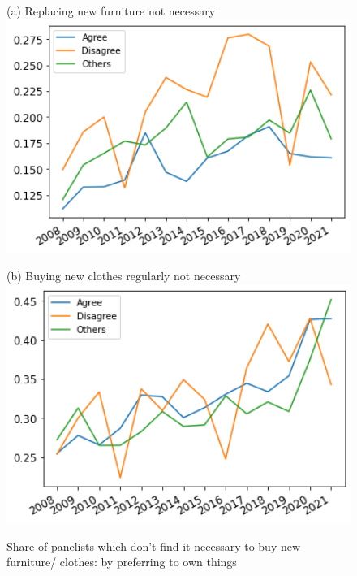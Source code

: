 \documentclass[12pt]{article}
\begin{document}
\begin{figure}[h!!]
	\centering	
	\caption{Share of panelists which don't find it necessary to buy new furniture/ clothes: by preferring to own things}\label{fig:evolution_notNecessary_bygroup:OwningProducts}	
	\begin{minipage}[h!!]{0.32\textwidth}  
		\centering\footnotesize{(a) Replacing new furniture not necessary}
		\includegraphics[width=1\textwidth]{../codding_data/results/liss/broad_groups_notnecessaryqk20a144_ci307.png}
	\end{minipage}
	\begin{minipage}[h!!]{0.32\textwidth}
		\centering\footnotesize{(b) Buying new clothes regularly not necessary}
		\includegraphics[width=1\textwidth]{../codding_data/results/liss/broad_groups_notnecessaryqk20a144_ci306.png}
	\end{minipage}
\end{figure}
\end{document}
